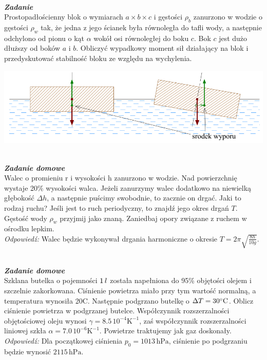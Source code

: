\documentclass[11pt,a4paper]{article}
\newcounter{zadanie}\newcommand{\zadanie}[1][]{\addtocounter{zadanie}{1} ~\\  {\bf \emph{Zadanie \arabic{zadanie} #1 }} \\}
\newcounter{zaddom}\newcommand{\zaddom}[1][]{\addtocounter{zaddom}{1} ~\\  {\bf \emph{Zadanie domowe \arabic{zaddom} #1 }} \\}
\begin{document}
\begin{minipage}{0.6\textwidth}
    \zadanie
    Prostopadłościenny blok o wymiarach $a\times b\times c$ i gęstości $\rho_b$ zanurzono w wodzie o gęstości $\rho_w$ tak, 
    że jedna z jego ścianek była równoległa do tafli wody, a następnie odchylono od pionu o kąt $\alpha$ wokół osi równoległej
    do boku $c$. Bok $c$ jest dużo dłuższy od boków $a$ i $b$. Obliczyć wypadkowy moment 
    sił działający na blok i przedyskutować stabilność bloku ze względu na wychylenia. 
    \end{minipage}
    \begin{minipage}{0.4\textwidth}
    \begin{center}
    \includegraphics[width=1.0\textwidth]{plywanie3.png}
    \end{center}
\end{minipage}


\newpage

\zaddom
Walec o promieniu r i wysokości h zanurzono w wodzie. Nad powierzchnię wystaje 20\% wysokości walca. Jeżeli zanurzymy walec dodatkowo na niewielką głębokość $\Delta h$, a następnie puścimy swobodnie, to zacznie on drgać. Jaki to rodzaj ruchu? Jeśli jest to ruch periodyczny, to znajdź jego okres drgań $T$. Gęstość wody $\rho_w$ przyjmij jako znaną. Zaniedbaj opory związane z ruchem w ośrodku lepkim.\\
{\em Odpowiedź:} Walec będzie wykonywał drgania harmoniczne o okresie $T = 2\pi \sqrt{\frac{8h}{10g}}$.

\zaddom
Szklana butelka o pojemności $1\textrm\,{l}$ została napełniona do 95\% objętości olejem i szczelnie zakorkowana. Ciśnienie powietrza miało przy tym wartość normalną, a temperatura wynosiła 20\degree C. Następnie podgrzano butelkę o $\Delta T = 30\degree\textrm{C}$. Oblicz ciśnienie powietrza w podgrzanej butelce. Współczynnik rozszerzalności objętościowej oleju wynosi $\gamma = 8.5\,10^{-4} \textrm{K}^{-1}$, zaś współczynnik rozszerzalności liniowej szkła $\alpha  = 7.0\,10^{-6} \textrm{K}^{-1}$. Powietrze traktujemy jak gaz doskonały.\\
{\em Odpowiedź:} Dla początkowej ciśnienia $p_0 = 1013\,\textrm{hPa}$, ciśnienie po podgrzaniu będzie wynosić $2115\,\textrm{hPa}$.
\end{document}
